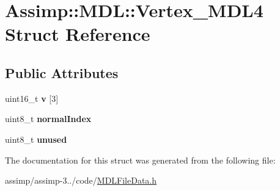 \hypertarget{struct_assimp_1_1_m_d_l_1_1_vertex___m_d_l4}{\section{Assimp\+:\+:M\+D\+L\+:\+:Vertex\+\_\+\+M\+D\+L4 Struct Reference}
\label{struct_assimp_1_1_m_d_l_1_1_vertex___m_d_l4}
}
\subsection*{Public Attributes}
\begin{DoxyCompactItemize}
\item 
\hypertarget{struct_assimp_1_1_m_d_l_1_1_vertex___m_d_l4_a80ccb837d91fc93b5a1ad4405e76c142}{uint16\+\_\+t {\bfseries v} \mbox{[}3\mbox{]}}\label{struct_assimp_1_1_m_d_l_1_1_vertex___m_d_l4_a80ccb837d91fc93b5a1ad4405e76c142}

\item 
\hypertarget{struct_assimp_1_1_m_d_l_1_1_vertex___m_d_l4_a5af89289801138de248e4e6988f74e5c}{uint8\+\_\+t {\bfseries normal\+Index}}\label{struct_assimp_1_1_m_d_l_1_1_vertex___m_d_l4_a5af89289801138de248e4e6988f74e5c}

\item 
\hypertarget{struct_assimp_1_1_m_d_l_1_1_vertex___m_d_l4_a61b0f3661b786735a293187ed9d55bff}{uint8\+\_\+t {\bfseries unused}}\label{struct_assimp_1_1_m_d_l_1_1_vertex___m_d_l4_a61b0f3661b786735a293187ed9d55bff}

\end{DoxyCompactItemize}


The documentation for this struct was generated from the following file\+:\begin{DoxyCompactItemize}
\item 
assimp/assimp-\/3../code/\hyperlink{_m_d_l_file_data_8h}{M\+D\+L\+File\+Data.\+h}\end{DoxyCompactItemize}
